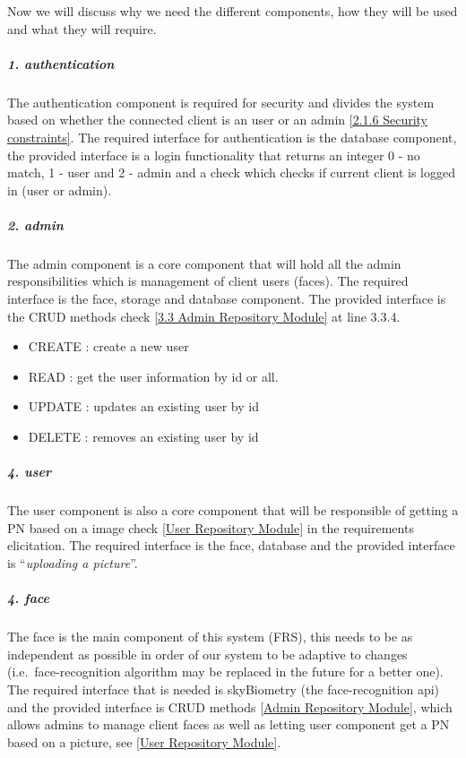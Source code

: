 \documentclass[a4paper,11pt]{article}
\begin{document}
Now we will discuss why we need the different components, how they will
be used and what they will require.

\subparagraph{1. authentication}\label{authentication}

The authentication component is required for security and divides the
system based on whether the connected client is an user or an admin \ref{2.1.6 Security constraints}. The
required interface for authentication is the database component, the
provided interface is a login functionality that returns an integer 0 -
no match, 1 - user and 2 - admin and a check which checks if current
client is logged in (user or admin).

\subparagraph{2. admin}\label{admin}

The admin component is a core component that will hold all the admin
responsibilities which is management of client users (faces). The
required interface is the face, storage and database component. The
provided interface is the CRUD methods check \ref{3.3 Admin Repository Module} at line 3.3.4.

\begin{itemize}
\item
  CREATE : create a new user
\item
  READ : get the user information by id or all.
\item
  UPDATE : updates an existing user by id
\item
  DELETE : removes an existing user by id
\end{itemize}

\subparagraph{4. user}\label{user}

The user component is also a core component that will be responsible of
getting a PN based on a image check \ref{User Repository Module} in the requirements elicitation. The required
interface is the face, database and the provided interface is
``\emph{uploading a picture}''. 

\subparagraph{4. face}\label{face}

The face is the main component of this system (FRS), this needs to be as
independent as possible in order of our system to be adaptive to changes
(i.e.~face-recognition algorithm may be replaced in the future for a
better one). The required interface that is needed is skyBiometry (the
face-recognition api) and the provided interface is CRUD methods \ref{Admin Repository Module}, which
allows admins to manage client faces as well as letting user component
get a PN based on a picture, see \ref{User Repository Module}.
\end{document}

